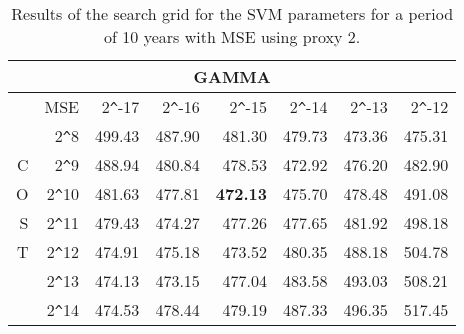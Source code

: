 \begin{table}[h!]
\centering
\begin{adjustbox}{width=\textwidth}
\begin{tabular}{|r|r|rrrrrr|}
\hline
\multicolumn{8}{|c|}{GAMMA} \tabularnewline
\hline
 &MSE& 2\verb|^|-17 & 2\verb|^|-16 & 2\verb|^|-15 & 2\verb|^|-14 & 2\verb|^|-13 & 2\verb|^|-12 \\ 
  \hline
  &2\verb|^|8 & 499.43 & 487.90 & 481.30 & 479.73 & 473.36 & 475.31 \\ 
  C&2\verb|^|9 & 488.94 & 480.84 & 478.53 & 472.92 & 476.20 & 482.90 \\ 
  O&2\verb|^|10 & 481.63 & 477.81 & \textbf{472.13} & 475.70 & 478.48 & 491.08 \\ 
  S&2\verb|^|11 & 479.43 & 474.27 & 477.26 & 477.65 & 481.92 & 498.18 \\ 
  T&2\verb|^|12 & 474.91 & 475.18 & 473.52 & 480.35 & 488.18 & 504.78 \\ 
  &2\verb|^|13 & 474.13 & 473.15 & 477.04 & 483.58 & 493.03 & 508.21 \\ 
  &2\verb|^|14 & 474.53 & 478.44 & 479.19 & 487.33 & 496.35 & 517.45 \\ 
   \hline
\end{tabular}
\end{adjustbox}
\caption{Results of the search grid for the SVM parameters for a period of 10 years with MSE using proxy 2.}
\end{table}